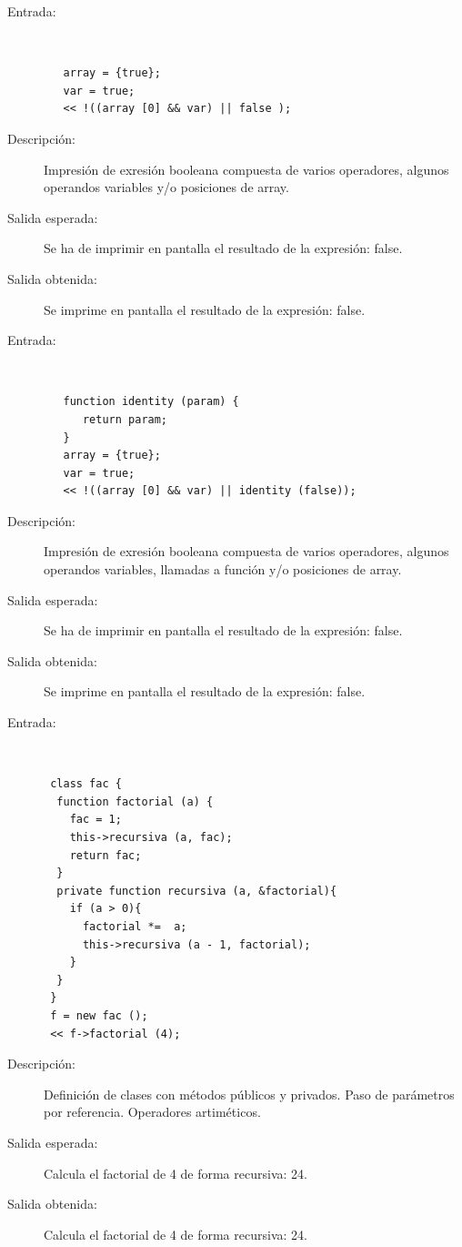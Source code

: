 \begin{framed}
	\begin{description}
		\item [Entrada:] \hfill \\
\begin{lstlisting}
   array = {true};
   var = true;
   << !((array [0] && var) || false );
\end{lstlisting}
		\item [Descripción:] Impresión de exresión booleana compuesta de varios operadores, algunos operandos variables y/o posiciones de array.
		\item [Salida esperada:] Se ha de imprimir en pantalla el resultado de la expresión: false.
		\item [Salida obtenida:] Se imprime en pantalla el resultado de la expresión: false.
	\end{description}
\end{framed} 

\begin{framed}
	\begin{description}
		\item [Entrada:] \hfill \\
\begin{lstlisting}
   function identity (param) {
      return param;
   }
   array = {true};
   var = true;
   << !((array [0] && var) || identity (false));
\end{lstlisting}
		\item [Descripción:] Impresión de exresión booleana compuesta de varios operadores, algunos operandos variables, llamadas a función y/o posiciones de array.
		\item [Salida esperada:] Se ha de imprimir en pantalla el resultado de la expresión: false.
		\item [Salida obtenida:] Se imprime en pantalla el resultado de la expresión: false.
	\end{description}
\end{framed} 

\begin{framed}
	\begin{description}
		\item [Entrada:] \hfill \\
\begin{lstlisting}
 class fac {
  function factorial (a) {
    fac = 1;
    this->recursiva (a, fac);
    return fac;
  }
  private function recursiva (a, &factorial){
    if (a > 0){
      factorial *=  a;
      this->recursiva (a - 1, factorial);
    } 
  }
 }
 f = new fac ();
 << f->factorial (4); 
\end{lstlisting}
		\item [Descripción:] Definición de clases con métodos públicos y privados. Paso de parámetros por referencia. Operadores artiméticos.
		\item [Salida esperada:] Calcula el factorial de 4 de forma recursiva: 24.
		\item [Salida obtenida:] Calcula el factorial de 4 de forma recursiva: 24.
	\end{description}
\end{framed} 

